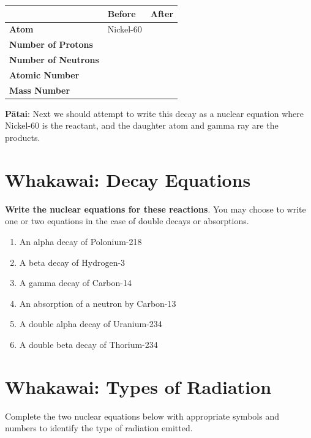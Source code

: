 \documentclass[12pt]{report}
\begin{document}
{\begin{table}[ht]
\centering
\begin{tabular}{|l|p{3cm}|p{3cm}|}
\hline
                            & \textbf{Before} & \textbf{After} \\ \hline
\textbf{Atom}               & Nickel-60       &                \\ \hline
\textbf{Number of Protons}  &                 &                \\ \hline
\textbf{Number of Neutrons} &                 &                \\ \hline
\textbf{Atomic Number}      &                 &                \\ \hline
\textbf{Mass Number}        &                 &                \\ \hline
\end{tabular}
\end{table}

\noindent\textbf{Pātai}: Next we should attempt to write this decay as a nuclear equation where Nickel-60 is the reactant, and the daughter atom and gamma ray are the products.
\vspace{1.5cm}

\section{Whakawai: Decay Equations}
\textbf{Write the nuclear equations for these reactions}. You may choose to write one or two equations in the case of double decays or absorptions.
\begin{enumerate}[itemsep=2cm]
	\item An alpha decay of Polonium-218
	\item A beta decay of Hydrogen-3
	\item A gamma decay of Carbon-14
	\item An absorption of a neutron by Carbon-13
	\item A double alpha decay of Uranium-234\vspace{1cm}
	\item A double beta decay of Thorium-234\vspace{1cm}
\end{enumerate}

\newpage
\section{Whakawai: Types of Radiation}
Complete the two nuclear equations below with appropriate symbols and numbers to identify the type of radiation emitted. 

}
\end{document}
